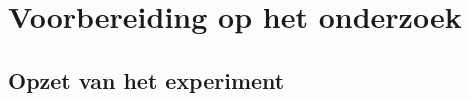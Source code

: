 
\chapter{Voorbereiding op het onderzoek}
\label{ch:voorbereidingonderzoek}

\section{Opzet van het experiment}


